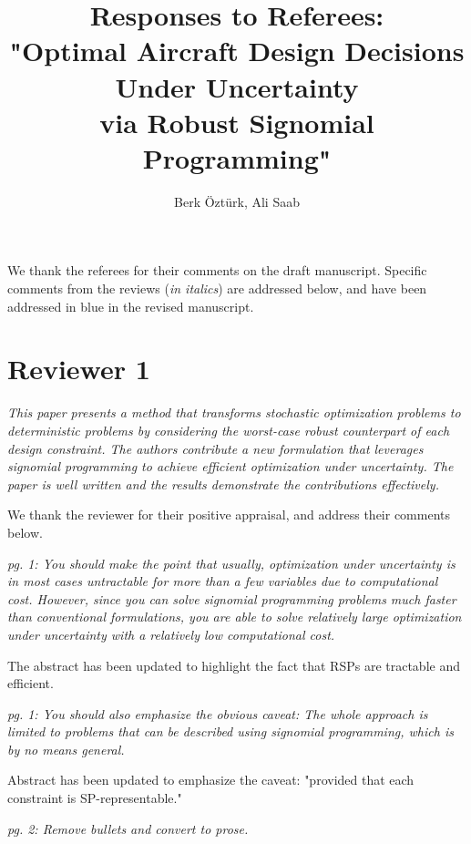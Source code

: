 \documentclass[11pt]{article}
\begin{document}
    \title{Responses to Referees: \\
    "Optimal Aircraft Design Decisions Under Uncertainty \\
    via Robust Signomial Programming"}
    
    \author{Berk \"Ozt\"urk, Ali Saab}

\maketitle

We thank the referees for their comments on the draft manuscript. Specific comments from the reviews (\textit{in italics}) are addressed below, and have been addressed {\color{blue} in blue} in the revised manuscript. 

\section{Reviewer 1}

\textit{This paper presents a method that transforms stochastic optimization problems to
deterministic problems by considering the worst-case robust counterpart of each design constraint.
The authors contribute a new formulation that leverages signomial programming to achieve
efficient optimization under uncertainty. The paper is well written and the results
demonstrate the contributions effectively.}

We thank the reviewer for their positive appraisal, and address their comments below. 

\textit{pg. 1: You should make the point that usually, optimization under uncertainty is
in most cases untractable for more than a few variables due to computational cost.
However, since you can solve signomial programming problems much faster than conventional formulations,
you are able to solve relatively large optimization under uncertainty with a relatively low computational cost.}

The abstract has been updated to highlight the fact that RSPs are tractable and efficient. 

\textit{pg. 1: You should also emphasize the obvious caveat: The whole approach
is limited to problems that can be described using signomial programming, which is by no means general.}

Abstract has been updated to emphasize the caveat: "provided that each constraint is SP-representable."

\textit{pg. 2: Remove bullets and convert to prose.}
\end{document}

